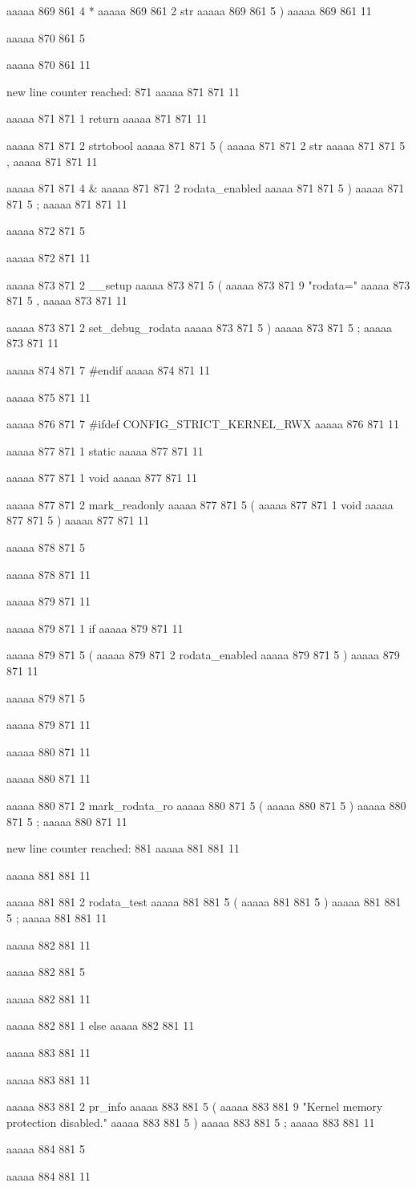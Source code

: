 aaaaa 869 861
4
*
aaaaa 869 861
2
str
aaaaa 869 861
5
)
aaaaa 869 861
11


aaaaa 870 861
5
{
aaaaa 870 861
11


new line counter reached: 871
aaaaa 871 871
11
	
aaaaa 871 871
1
return
aaaaa 871 871
11
 
aaaaa 871 871
2
strtobool
aaaaa 871 871
5
(
aaaaa 871 871
2
str
aaaaa 871 871
5
,
aaaaa 871 871
11
 
aaaaa 871 871
4
&
aaaaa 871 871
2
rodata_enabled
aaaaa 871 871
5
)
aaaaa 871 871
5
;
aaaaa 871 871
11


aaaaa 872 871
5
}
aaaaa 872 871
11


aaaaa 873 871
2
__setup
aaaaa 873 871
5
(
aaaaa 873 871
9
"rodata="
aaaaa 873 871
5
,
aaaaa 873 871
11
 
aaaaa 873 871
2
set_debug_rodata
aaaaa 873 871
5
)
aaaaa 873 871
5
;
aaaaa 873 871
11


aaaaa 874 871
7
#endif
aaaaa 874 871
11


aaaaa 875 871
11


aaaaa 876 871
7
#ifdef CONFIG_STRICT_KERNEL_RWX
aaaaa 876 871
11


aaaaa 877 871
1
static
aaaaa 877 871
11
 
aaaaa 877 871
1
void
aaaaa 877 871
11
 
aaaaa 877 871
2
mark_readonly
aaaaa 877 871
5
(
aaaaa 877 871
1
void
aaaaa 877 871
5
)
aaaaa 877 871
11


aaaaa 878 871
5
{
aaaaa 878 871
11


aaaaa 879 871
11
	
aaaaa 879 871
1
if
aaaaa 879 871
11
 
aaaaa 879 871
5
(
aaaaa 879 871
2
rodata_enabled
aaaaa 879 871
5
)
aaaaa 879 871
11
 
aaaaa 879 871
5
{
aaaaa 879 871
11


aaaaa 880 871
11
	
aaaaa 880 871
11
	
aaaaa 880 871
2
mark_rodata_ro
aaaaa 880 871
5
(
aaaaa 880 871
5
)
aaaaa 880 871
5
;
aaaaa 880 871
11


new line counter reached: 881
aaaaa 881 881
11
	
aaaaa 881 881
11
	
aaaaa 881 881
2
rodata_test
aaaaa 881 881
5
(
aaaaa 881 881
5
)
aaaaa 881 881
5
;
aaaaa 881 881
11


aaaaa 882 881
11
	
aaaaa 882 881
5
}
aaaaa 882 881
11
 
aaaaa 882 881
1
else
aaaaa 882 881
11


aaaaa 883 881
11
	
aaaaa 883 881
11
	
aaaaa 883 881
2
pr_info
aaaaa 883 881
5
(
aaaaa 883 881
9
"Kernel memory protection disabled.\n"
aaaaa 883 881
5
)
aaaaa 883 881
5
;
aaaaa 883 881
11


aaaaa 884 881
5
}
aaaaa 884 881
11


